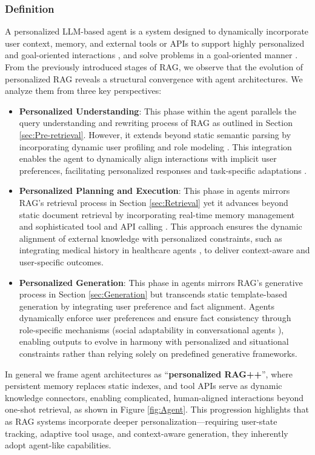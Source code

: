 \subsubsection{\textbf{Definition}}
A personalized LLM-based agent is a system designed to dynamically incorporate user context, memory, and external tools or APIs to support highly personalized and goal-oriented interactions \cite{xi2025rise,huang2024understanding,chen2024persona}, and solve problems in a goal-oriented manner \cite{li2024personal,singh2025agentic}.
From the previously introduced stages of RAG, we observe that the evolution of personalized RAG reveals a structural convergence with agent architectures. We analyze them from three key perspectives: 
\begin{itemize}[leftmargin=*]
\item \textbf{Personalized Understanding}: This phase within the agent parallels the query understanding and rewriting process of RAG as outlined in Section \ref{sec:Pre-retrieval}. However, it extends beyond static semantic parsing by incorporating dynamic user profiling \cite{wang2023rolellm} and role modeling \cite{shao2023character}. This integration enables the agent to dynamically align interactions with implicit user preferences, facilitating personalized responses and task-specific adaptations \cite{ran2024capturing}.
%
\item \textbf{Personalized Planning and Execution}: This phase in agents mirrors RAG's retrieval process in Section \ref{sec:Retrieval} yet it advances beyond static document retrieval by incorporating real-time memory management \cite{park2023generative} and sophisticated tool and API calling \cite{wangvoyager}. This approach ensures the dynamic alignment of external knowledge with personalized constraints, such as integrating medical history in healthcare agents \cite{abbasian2023conversational}, to deliver context-aware and user-specific outcomes. %
%
\item \textbf{Personalized Generation}: This phase in agents mirrors RAG's generative process in Section \ref{sec:Generation} but transcends static template-based generation by integrating user preference and fact alignment. Agents dynamically enforce user preferences and ensure fact consistency through role-specific mechanisms (\eg social adaptability in conversational agents \cite{abbasian2023conversational}), enabling outputs to evolve in harmony with personalized and situational constraints rather than relying solely on predefined generative frameworks.

\end{itemize}
 In general we frame agent architectures as ``\textbf{personalized RAG++}'', where persistent memory \cite{wang2024crafting} replaces static indexes, and tool APIs \cite{cai2025large} serve as dynamic knowledge connectors, enabling complicated, human-aligned interactions beyond one-shot retrieval, as shown in Figure \ref{fig:Agent}. This progression highlights that as RAG systems incorporate deeper personalization—requiring user-state tracking, adaptive tool usage, and context-aware generation, they inherently adopt agent-like capabilities.

